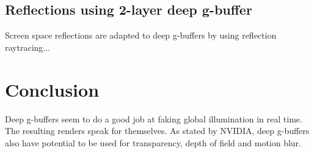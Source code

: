 \documentclass{ACGSeminar}
\begin{document}
	\subsection{Reflections using 2-layer deep g-buffer}
		Screen space reflections are adapted to deep g-buffers by using reflection raytracing... 

\section{Conclusion}
	Deep g-buffers seem to do a good job at faking global illumination in real time. The resulting renders speak for themselves. As stated by NVIDIA, deep g-buffers also have potential to be used for transparency, depth of field and motion blur.

\printbibliography
\end{document}
